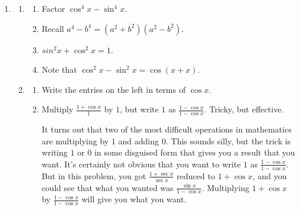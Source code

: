 \documentclass[english]{book}
\begin{document}
\begin{enumerate}
  \item \begin{enumerate}  %
    \item \begin{enumerate}[\hspace{1cm}a)]
            \item Factor $\cos^{4} x - \sin^{4} x$.
            \item Recall $a^4 - b^4 = (a^2 + b^2)(a^2 - b^2)$.
            \item $sin^{2} x + \cos^{2} x = 1$.
            \item Note that $\cos^{2} x - \sin^{2} x = \cos(x+x)$.
          \end{enumerate}
    \item \begin{enumerate}[\hspace{1cm}a)]
            \item Write the entries on the left in terms of $\cos x$.
            \item Multiply $\frac{1+ \cos x}{1}$ by $1$, but write $1$ as $\frac{1- \cos x}{1- \cos x}$. Tricky, but effective.

                  \vspace{0.3cm}
                  
                  It turns out that two of the most difficult operations in mathematics are multiplying by $1$ and adding $0$. This sounds silly, but the trick is writing $1$ or $0$ in some disguised form that gives you a result that you want. It's certainly not obvious that you want to write $1$ as $\frac{1- \cos x}{1- \cos x}$. But in this problem, you got $\frac{1+ \sec x}{\sec x}$ reduced to $1+ \cos x$, and you could see that what you wanted was $\frac{\sin x}{1- \cos x}$. Multiplying $1+ \cos x$ by $\frac{1- \cos x}{1- \cos x}$ will give you what you want.

                  \vspace{0.3cm}
                  

\end{enumerate}
\end{enumerate}
\end{enumerate}
\end{document}
